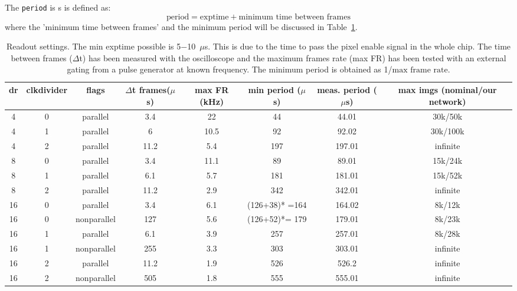 \documentclass{article}
\begin{document}
The {\tt{period}} is s is defined as:
\begin{equation} \label{period}
\textrm{period}  = \textrm{exptime} + \textrm{minimum time between frames}
\end{equation}
where the 'minimum time between frames' and the minimum period will be discussed in Table~\ref{tframes}.
\begin{tiny}
\begin{table}
\begin{flushleft}
\begin{tabular}{|c|c|c|c|c|c|c|c|}
\hline
\tiny{dr} & \tiny{clkdivider} & \tiny{flags} & \tiny{$\Delta$t frames($\mu$s) } &  \tiny{max FR (kHz)} & \tiny{min period ($\mu$s)} & \tiny{meas. period ($\mu$s)} & \tiny{max imgs (nominal/our network)}\\
\hline
4 & 0 & \tiny {parallel} & 3.4 & 22  & 44 & 44.01 & 30k/50k\\
\hline
4 & 1 & \tiny {parallel} & 6 & 10.5 & 92 & 92.02 & 30k/100k\\
\hline
4 & 2 & \tiny {parallel} & 11.2 & 5.4 & 197& 197.01 & infinite\\
\hline
\hline
8 & 0 & \tiny {parallel} & 3.4 & 11.1 & 89 & 89.01 & 15k/24k\\
\hline
8 & 1 & \tiny {parallel} & 6.1 & 5.7 & 181 & 181.01 & 15k/52k\\
\hline
8 & 2 & \tiny {parallel} & 11.2 &  2.9 &  342 & 342.01 & infinite\\
\hline
\hline
16 & 0 & \tiny {parallel} & 3.4 & 6.1 & (126+38)* =164 & 164.02 & 8k/12k\\
\hline
16 & 0 & \tiny {nonparallel} &  127 & 5.6 & (126+52)*= 179 & 179.01& 8k/23k\\
\hline
16 & 1 & \tiny {parallel} &  6.1 & 3.9 &  257 & 257.01 & 8k/28k\\
\hline
16 & 1 & \tiny {nonparallel} & 255 & 3.3 &  303 & 303.01 & infinite\\
\hline
16 & 2 & \tiny {parallel} &  11.2 & 1.9 & 526 & 526.2 & infinite \\
\hline
16 & 2 & \tiny {nonparallel} & 505 & 1.8  & 555 & 555.01& infinite\\
\hline
\end{tabular}
\caption{Readout settings. The {\tiny{min exptime}} possible is 5$-$10~$\mu$s. This is due to the time to pass the pixel enable signal in the whole chip. The time between frames ($\Delta$t) has been measured with the oscilloscope and the maximum frames rate (max FR) has been tested with an external gating from a pulse generator at known frequency. The minimum period is obtained as 1/$\textrm{max frame rate}$.}
\label{tframes}
\end{flushleft}
\end{table}
\end{tiny}
\end{document}
